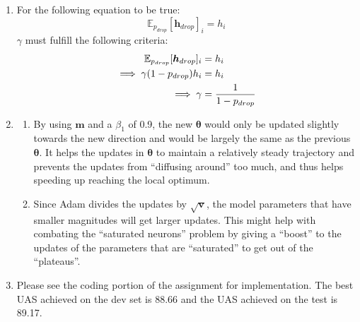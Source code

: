 \documentclass[10pt,reqno]{amsart}
\begin{document}
\begin{enumerate}[topsep=0pt,itemsep=3ex,partopsep=1ex,parsep=1ex]
\begin{enumerate}[itemsep=2ex]
  \item 
    For the following equation to be true:
    \begin{equation*}
      \mathbb{E}_{p_{drop}} [\bm{h}_{drop}]_i = h_i
    \end{equation*}
    $\gamma$ must fulfill the following criteria:
    \begin{align*}
      \mathbb{E}_{p_{drop}} [\bm{h}_{drop}]_i &= h_i \\
      \implies \gamma (1 - p_{drop}) h_i &= h_i \\
      \implies \gamma &= \frac{1}{1 - p_{drop}} \\
    \end{align*}
  \item 
    \begin{enumerate}[itemsep=2ex]
      \item By using $\bm{m}$ and a $\beta_1$ of 0.9, the new $\bm{\theta}$ would only 
        be updated slightly towards the new direction and would be largely the same 
        as the previous $\bm{\theta}$. It helps the 
        updates in $\bm{\theta}$ to maintain a relatively steady trajectory and prevents 
        the updates from ``diffusing around'' too much, and thus helps speeding up 
        reaching the local optimum. 
      \item Since Adam divides the updates by $\sqrt{\bm{v}}$, the model parameters that 
        have smaller magnitudes will get larger updates. This might help with combating 
        the ``saturated neurons'' problem by giving a ``boost'' to the updates of 
        the parameters that are ``saturated'' to get out of the ``plateaus''.
    \end{enumerate}
  \item Please see the coding portion of the assignment for implementation.
    The best UAS achieved on the dev set is 88.66 
    and the UAS achieved on the test is 89.17. 
  \end{enumerate}



\end{enumerate}
\end{document}
